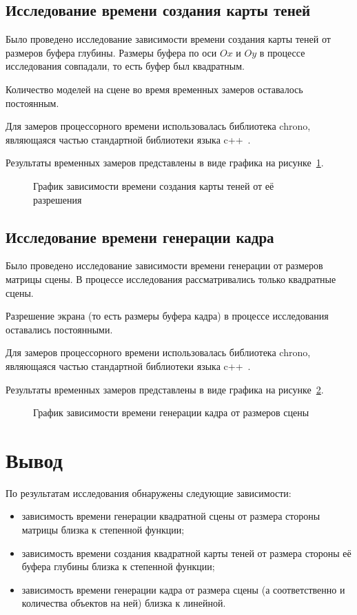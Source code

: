 \subsection*{Исследование времени создания карты теней}

Было проведено исследование зависимости времени создания карты теней от размеров буфера глубины. Размеры буфера по оси $Ox$ и $Oy$ в процессе исследования совпадали, то есть буфер был квадратным.

Количество моделей на сцене во время временных замеров оставалось постоянным.

Для замеров процессорного времени использовалась библиотека chrono, являющаяся частью стандартной библиотеки языка c++~\cite{cpp}.

Результаты временных замеров представлены в виде графика на рисунке~\ref{fig:smap_graph}.

\begin{figure}[h!]
  \centering
  
  \caption{График зависимости времени создания карты теней от её разрешения}
  \label{fig:smap_graph}
\end{figure}

\subsection*{Исследование времени генерации кадра}

Было проведено исследование зависимости времени генерации от размеров матрицы сцены. В процессе исследования рассматривались только квадратные сцены.

Разрешение экрана (то есть размеры буфера кадра) в процессе исследования оставались постоянными.

Для замеров процессорного времени использовалась библиотека chrono, являющаяся частью стандартной библиотеки языка c++~\cite{cpp}.

Результаты временных замеров представлены в виде графика на рисунке~\ref{fig:render_graph}.

\begin{figure}[h!]
  \centering
  
  \caption{График зависимости времени генерации кадра от размеров сцены}
  \label{fig:render_graph}
\end{figure}

\newpage

\section{Вывод}

По результатам исследования обнаружены следующие зависимости:
\begin{itemize}
  \item зависимость времени генерации квадратной сцены от размера стороны матрицы близка к степенной функции; 
  \item зависимость времени создания квадратной карты теней от размера стороны её буфера глубины близка к степенной функции; 
  \item зависимость времени генерации кадра от размера сцены (а соответственно и количества объектов на ней) близка к линейной.
\end{itemize}
